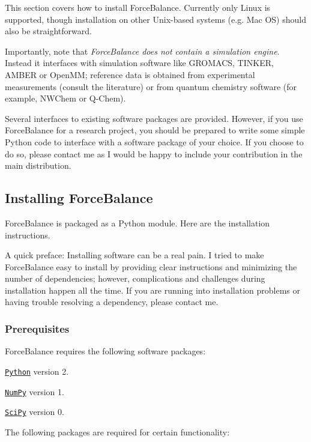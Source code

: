 \-This section covers how to install \-Force\-Balance. \-Currently only \-Linux is supported, though installation on other \-Unix-\/based systems (e.\-g. \-Mac \-O\-S) should also be straightforward.

\-Importantly, note that {\itshape \-Force\-Balance does not contain a simulation engine\/}. \-Instead it interfaces with simulation software like \-G\-R\-O\-M\-A\-C\-S, \-T\-I\-N\-K\-E\-R, \-A\-M\-B\-E\-R or \-Open\-M\-M; reference data is obtained from experimental measurements (consult the literature) or from quantum chemistry software (for example, \-N\-W\-Chem or \-Q-\/\-Chem).

\-Several interfaces to existing software packages are provided. \-However, if you use \-Force\-Balance for a research project, you should be prepared to write some simple \-Python code to interface with a software package of your choice. \-If you choose to do so, please contact me as \-I would be happy to include your contribution in the main distribution.\hypertarget{installation_installing_forcebalance}{}\subsection{\-Installing Force\-Balance}\label{installation_installing_forcebalance}
\-Force\-Balance is packaged as a \-Python module. \-Here are the installation instructions.

\-A quick preface\-: \-Installing software can be a real pain. \-I tried to make \-Force\-Balance easy to install by providing clear instructions and minimizing the number of dependencies; however, complications and challenges during installation happen all the time. \-If you are running into installation problems or having trouble resolving a dependency, please contact me.\hypertarget{installation_installing_forcebalance_prereq}{}\subsubsection{\-Prerequisites}\label{installation_installing_forcebalance_prereq}
\-Force\-Balance requires the following software packages\-:

\begin{DoxyItemize}
\item \href{http://www.python.org/}{\tt \-Python} version 2. \item \href{http://numpy.scipy.org/}{\tt \-Num\-Py} version 1. \item \href{http://www.scipy.org/}{\tt \-Sci\-Py} version 0.\end{DoxyItemize}
\-The following packages are required for certain functionality\-:

